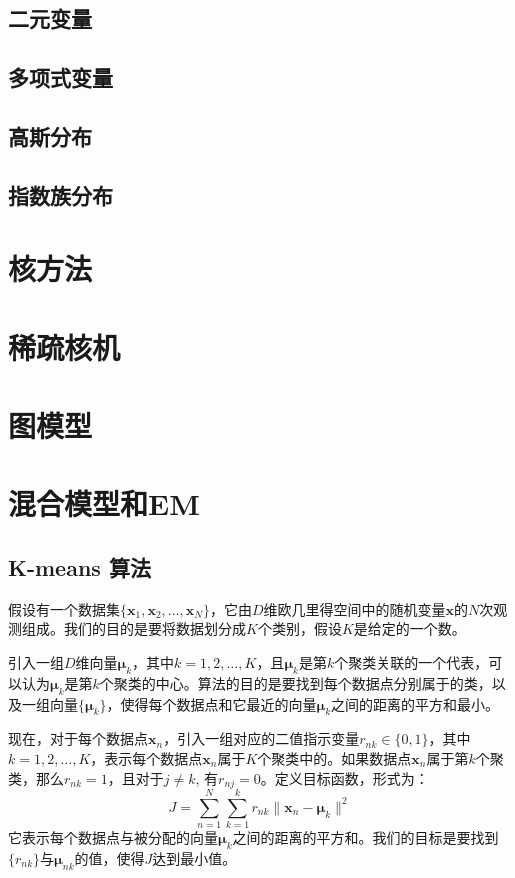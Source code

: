 \documentclass[11pt]{ctexbook}
\begin{document}
\section{二元变量}
\section{多项式变量}
\section{高斯分布}
\section{指数族分布}


\chapter{核方法}

\chapter{稀疏核机}

\chapter{图模型}

\chapter{混合模型和EM}
\section{K-means 算法}
假设有一个数据集$\{ \bm x_1, \bm x_2, \ldots, \bm x_N\}$，它由$D$维欧几里得空间中的随机变量$\bm x$的$N$次观测组成。我们的目的是要将数据划分成$K$个类别，假设$K$是给定的一个数。

引入一组$D$维向量$\bm \mu_k$，其中$k=1, 2, \ldots, K$，且$\bm \mu_k$是第$k$个聚类关联的一个代表，可以认为$\bm \mu_k$是第$k$个聚类的中心。算法的目的是要找到每个数据点分别属于的类，以及一组向量$\{\bm \mu_k\}$，使得每个数据点和它最近的向量$\bm \mu_k$之间的距离的平方和最小。

现在，对于每个数据点$\bm x_n$，引入一组对应的二值指示变量$r_{nk} \in \{0, 1\}$，其中 $k = 1, 2, \ldots, K$，表示每个数据点$\bm x_n$属于$K$个聚类中的。如果数据点$\bm x_n$属于第$k$个聚类，那么$r_{nk}=1$，且对于$j \neq k$, 有$r_{nj} = 0$。定义目标函数，形式为：
\begin{equation}
	\label{eq:kmeas-cost}
	J = \sum_{n=1}^{N}\sum_{k=1}^{k}r_{nk}\| \bm x_n - \bm \mu_k \|^2
\end{equation}
它表示每个数据点与被分配的向量$\bm \mu_k$之间的距离的平方和。我们的目标是要找到$\{r_{nk}\}$与$\bm \mu_{nk}$的值，使得$J$达到最小值。
\end{document}
